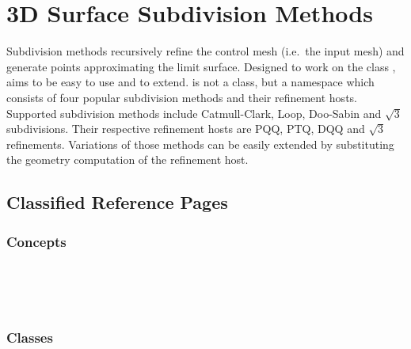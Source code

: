 
\chapter{3D Surface Subdivision Methods}
\label{chapterSubdivisionRef}



Subdivision methods recursively refine the control mesh 
(i.e.~the input mesh) and generate points approximating 
the limit surface. 
Designed to work on the class ,
 aims to be easy to use and to extend.
 is not a class, but a namespace 
which consists of four popular subdivision methods and their refinement
hosts. Supported subdivision methods include Catmull-Clark, Loop, 
Doo-Sabin and $\sqrt{3}$ subdivisions. Their respective refinement 
hosts are PQQ, PTQ, DQQ and $\sqrt{3}$ refinements.
Variations of those methods can be easily 
extended by substituting the geometry computation of the refinement
host.


\section{Classified Reference Pages}

\subsection*{Concepts}
\\
\\
\\

\subsection*{Classes}

